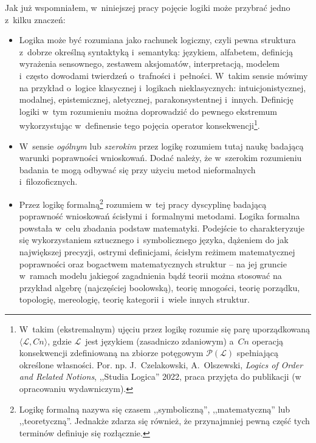 Jak już wspomniałem, w~niniejszej pracy pojęcie logiki może przybrać jedno z~kilku znaczeń:
\begin{itemize}
\item Logika może być rozumiana jako rachunek logiczny, czyli pewna struktura z~dobrze określną syntaktyką i~semantyką: językiem, alfabetem, definicją wyrażenia sensownego, zestawem aksjomatów, interpretacją, modelem i~często dowodami twierdzeń o~trafności i~pełności. W~takim sensie mówimy na przykład o~logice klasycznej i~logikach nieklasycznych: intuicjonistycznej, modalnej, epistemicznej, aletycznej, parakonsystentnej i~innych. Definicję logiki w~tym rozumieniu można doprowadzić do pewnego ekstremum wykorzystując w~definensie tego pojęcia operator konsekwencji\footnote{W~takim (ekstremalnym) ujęciu przez logikę rozumie się parę uporządkowaną $\langle \mathcal{L}, Cn\rangle$, gdzie $\mathcal{L}$~jest językiem (zasadniczo zdaniowym) a~$Cn$ operacją konsekwencji zdefiniowaną na zbiorze potęgowym $\mathcal{P}(\mathcal{L})$ spełniającą określone własności. Por. np. J.~Czelakowski, A.~Olszewski, \textit{Logics of Order and Related} \textit{Notions}, ,,Studia Logica'' 2022, praca przyjęta do publikacji (w opracowaniu wydawniczym).}.
\item W~sensie \textit{ogólnym} lub \textit{szerokim} przez logikę rozumiem tutaj naukę badającą warunki poprawności wnioskowań. Dodać należy, że w~szerokim rozumieniu badania te mogą odbywać się przy użyciu metod nieformalnych i~filozoficznych.
\item Przez logikę formalną\footnote{Logikę formalną nazywa się czasem ,,symboliczną'', ,,matematyczną'' lub ,,teoretyczną''. Jednakże zdarza się również, że przynajmniej pewną część tych terminów definiuje się rozłącznie.} rozumiem w~tej pracy dyscyplinę badającą poprawność wnioskowań ścisłymi i~formalnymi metodami. Logika formalna powstała w~celu zbadania podstaw matematyki. Podejście to charakteryzuje się wykorzystaniem sztucznego i~symbolicznego języka, dążeniem do jak największej precyzji, ostrymi definicjami, ścisłym reżimem matematycznej poprawności oraz bogactwem matematycznych struktur -- na jej gruncie w~ramach modelu jakiegoś zagadnienia bądź teorii można stosować na przykład algebrę (najczęściej boolowską), teorię mnogości, teorię porządku, topologię, mereologię, teorię kategorii i~wiele innych struktur.
\end{itemize}
